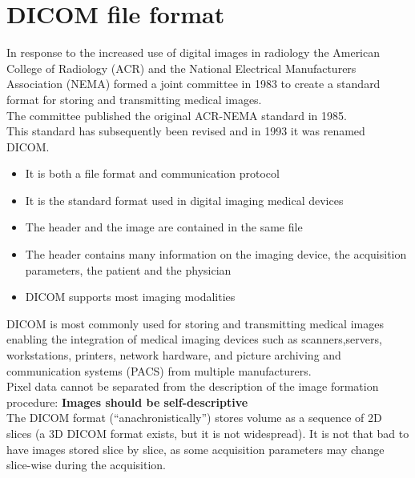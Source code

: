 \section{DICOM file format}
In response to the increased use of digital images in radiology the American College of Radiology (ACR) and the National Electrical Manufacturers Association (NEMA) formed a joint committee in 1983 to create a standard format for storing and transmitting medical images.\\
The committee published the original ACR-NEMA standard in 1985.\\
This standard has subsequently been revised and in 1993 it was renamed DICOM.

\begin{tcolorbox}[width=\textwidth,colback={white},title={\textbf{Di}gital Imaging and \textbf{CO}mmunication in \textbf{M}edicine (\textbf{DICOM}): },colbacktitle=cyan,coltitle=black]
	\begin{itemize}
		\item It is both a file format and communication protocol
		\item It is the standard format used in digital imaging medical devices
		\item The header and the image are contained in the same file
		\item The header contains many information on the imaging device, the acquisition parameters, the patient and the physician\\
		
		\item DICOM supports most imaging modalities
	\end{itemize}
\end{tcolorbox}

DICOM is most commonly used for storing and transmitting medical images enabling the integration of medical imaging devices such as scanners,servers, workstations, printers, network hardware, and picture archiving and communication systems (PACS) from multiple manufacturers.\\

Pixel data cannot be separated from the description of the image formation procedure: \textbf{Images should be self-descriptive}\\

The DICOM format (“anachronistically”) stores volume as a sequence of 2D slices (a 3D DICOM format exists, but it is not widespread). It is not that bad to have images stored slice by slice, as some acquisition parameters may change slice-wise during the acquisition.\\

